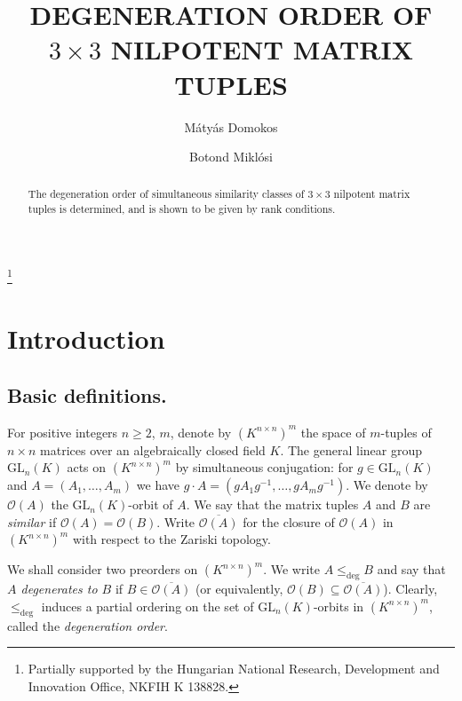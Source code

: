 \documentclass[12pt]{amsart}
\title{DEGENERATION ORDER OF $3\times 3$ NILPOTENT MATRIX TUPLES}
\author[M\'aty\'as Domokos]
{M\'aty\'as Domokos}
\author[Botond Mikl\'osi]{Botond Mikl\'osi}
\date{}
\newcommand{\field}{K}
\begin{document}
\thanks{Partially supported by the Hungarian National Research, Development and Innovation Office,  NKFIH K 138828.}


\begin{abstract}
The degeneration order of simultaneous similarity classes 
of $3\times 3$ nilpotent matrix tuples is determined, and is  
shown to be given by rank conditions. 
\end{abstract}

\maketitle 

\def\lt{\mathrm{B}} %
\def\slt{\mathfrak{n}} %
\def\GL{\mathrm{GL}} 
\def\lhom{\le_{\mathrm{hom}}}
\def\ldeg{\le_{\mathrm{deg}}}
\def\lshom{<_{\mathrm{hom}}}

\section{Introduction}\label{sec:basic definitions}

\subsection{Basic definitions.}

For positive integers $n\ge 2$, $m$,  
denote by $(\field^{n\times n})^m$ the space of $m$-tuples of $n\times n$ matrices 
over an algebraically closed field $\field$.  
The general linear group $\GL_n(\field)$ acts on 
$(\field^{n\times n})^m$ by simultaneous conjugation: 
for $g\in \GL_n(\field)$ and $A=(A_1,\dots,A_m)$ 
we have $g\cdot A=(gA_1g^{-1},\dots,gA_mg^{-1})$. 
We denote by $\mathcal{O}(A)$ the 
$\GL_n(\field)$-orbit of $A$. 
We say that the matrix tuples $A$ and $B$ are \emph{similar} 
if $\mathcal{O}(A)=\mathcal{O}(B)$. 
Write $\overline{\mathcal{O}(A)}$ for the closure of $\mathcal{O}(A)$ in $(\field^{n\times n})^m$ 
with respect to the Zariski topology. 

We shall consider two preorders on $(\field^{n\times n})^m$. 
We write $A\ldeg B$ and say that \emph{$A$ degenerates to $B$} if 
$B\in \overline{\mathcal{O}(A)}$ (or equivalently, 
$\mathcal{O}(B)\subseteq \overline{\mathcal{O}(A)}$). 
Clearly, $\ldeg$ induces a partial ordering on the set of $\GL_n(\field)$-orbits in 
$(\field^{n\times n})^m$, called the \emph{degeneration order}. 
\end{document}
